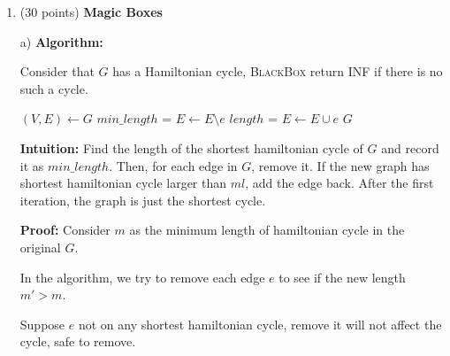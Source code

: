 \documentclass{article}
\newcommand{\Algorithm}{\textbf{Algorithm: }}
\newcommand{\Intuition}{\textbf{Intuition: }}
\newcommand{\Proof}{\textbf{Proof: }}
\newcommand{\Complexity}{\textbf{Complexity: }}
\newcounter{problem}
\begin{document}
\begin{enumerate}[topsep=0pt,parsep=1mm]
\Proof
For DNF, because clauses are connected by or logic, so for any clause to be true,
the whole proposition is true.

Inside each clause, the literals are connected by and logic. 
Because we just want to find a satisfiable situation,
we can set the literals to be true or false.
So, the only situation that a clause is false is that it can never be true,
means there is $a\land\neg a$ case.

\Complexity
$O(n)$. Because the two loops iterates through the literals once which is $O(n)$,
and the check in set takes $O(1)$.

b) However, at least convert the CNF to DNF is a NP-Hard problem.
$CNF-SAT\le_P DNF-SAT$ requires that $CNF\rightarrow DNF$ to be $P$
which has not been proved. 
Therefore, because the prepare for new input is not $P$,
this reduction is not $P$, therefore cannot prove $P=NP$


\item (30 points) \textbf{Magic Boxes} 

a) \Algorithm

Consider that $G$ has a Hamiltonian cycle, \textsc{BlackBox} return INF if there is no such a cycle.

\begin{algorithm}[H]
  \DontPrintSemicolon
    

   {
    $(V,E)\gets G$\;
    $min\_length$ = \;
     {
      $E\gets E\setminus e$\;
      $length$ = \;
       {
        $E\gets E\cup e$
      }
    }
    \Return $G$
  }
\end{algorithm}

\Intuition
Find the length of the shortest hamiltonian cycle of $G$ and record it as $min\_length$.
Then, for each edge in $G$, remove it. If the new graph has shortest hamiltonian cycle larger than $ml$, add the edge back.
After the first iteration, the graph is just the shortest cycle.

\Proof
Consider $m$ as the minimum length of hamiltonian cycle in the original $G$.

In the algorithm, we try to remove each edge $e$ to see if the new length $m'>m$.

Suppose $e$ not on any shortest hamiltonian cycle, remove it will not affect the cycle, safe to remove.


\end{enumerate}
\end{document}
